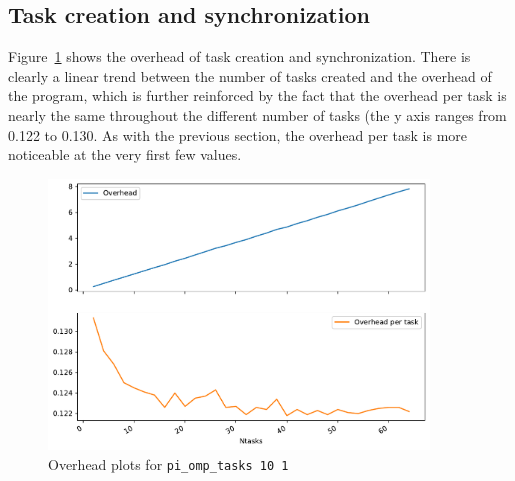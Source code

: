 \pagebreak
\null\vfill
\subsection{Task creation and synchronization}

Figure~\ref{fig:task} shows the overhead of task creation and synchronization. There is clearly a linear
trend between the number of tasks created and the overhead of the program, which is further reinforced by the
fact that the overhead per task is nearly the same throughout the different number of tasks (the y
axis ranges from 0.122 to 0.130. As with the previous section, the overhead per task is more noticeable
at the very first few values.

\vspace{5em}

\begin{figure}[H]
    \centering
    \caption{Overhead plots for \texttt{pi\_omp\_tasks 10 1}}%
    \label{fig:task}
    \includegraphics[width=0.9\textwidth]{data/tasks_sub.pdf}
\end{figure}

\null\vfill


